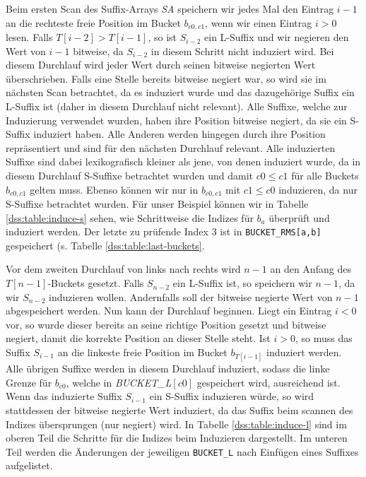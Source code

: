 Beim ersten Scan des Suffix-Arrays \textit{SA} speichern wir jedes Mal den Eintrag $i-1$ an die rechteste freie Position im Bucket $b_{c0,c1}$, wenn wir einen Eintrag $i > 0$ lesen. Falls $T[i-2] > T[i-1]$, so ist $S_{i-2}$ ein L-Suffix und wir negieren den Wert von $i-1$ bitweise, da $S_{i-2}$ in diesem Schritt nicht induziert wird. Bei diesem Durchlauf wird jeder Wert durch seinen bitweise negierten Wert überschrieben. Falls eine Stelle bereits bitweise negiert war, so wird sie im nächsten Scan betrachtet, da es induziert wurde und das dazugehörige Suffix ein L-Suffix ist (daher in diesem Durchlauf nicht relevant). Alle Suffixe, welche zur Induzierung verwendet wurden, haben ihre Position bitweise negiert, da sie ein S-Suffix induziert haben. Alle Anderen werden hingegen durch ihre Position repräsentiert und sind für den nächsten Durchlauf relevant. Alle induzierten Suffixe sind dabei lexikografisch kleiner als jene, von denen induziert wurde, da in diesem Durchlauf S-Suffixe betrachtet wurden und damit $c0 \leq c1$ für alle Buckets $b_{c0,c1}$ gelten muss. Ebenso können wir nur in $b_{c0,c1}$ mit $c1 \leq c0$ induzieren, da nur S-Suffixe betrachtet wurden. Für unser Beispiel können wir in Tabelle \ref{dss:table:induce-s} sehen, wie Schrittweise die Indizes für $b_{a}$ überprüft und induziert werden. Der letzte zu prüfende Index 3 ist in \texttt{BUCK\-ET\_RMS[a,b]} gespeichert (s. Tabelle \ref{dss:table:last-buckets}.

Vor dem zweiten Durchlauf von links nach rechts wird $n-1$ an den Anfang des $T[n-1]$-Buckets gesetzt. Falls $S_{n-2}$ ein L-Suffix ist, so speichern wir $n-1$, da wir $S_{n-2}$ induzieren wollen. Andernfalls soll der bitweise negierte Wert von $n-1$ abgespeichert werden. Nun kann der Durchlauf beginnen.
Liegt ein Eintrag $i < 0$ vor, so wurde dieser bereits an seine richtige Position gesetzt und bitweise negiert, damit die korrekte Position an dieser Stelle steht. Ist $i > 0$, so muss das Suffix $S_{i-1}$ an die linkeste freie Position im Bucket $b_{T[i-1]}$ induziert werden. Alle übrigen Suffixe werden in diesem Durchlauf induziert, sodass die linke Grenze für $b_{c0}$, welche in \textit{BUCK\-ET\_L$[c0]$} gespeichert wird, ausreichend ist. Wenn das induzierte Suffix $S_{i-1}$ ein S-Suffix induzieren würde, so wird stattdessen der bitweise negierte Wert induziert, da das Suffix beim scannen des Indizes übersprungen (nur negiert) wird. In Tabelle \ref{dss:table:induce-l} sind im oberen Teil die Schritte für die Indizes beim Induzieren dargestellt. Im unteren Teil werden die Änderungen der jeweiligen \texttt{BUCK\-ET\_L} nach Einfügen eines Suffixes aufgelistet.
